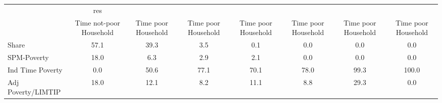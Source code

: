 \begin{tabular}{l*{7}{c}}
\hline\hline
            &         res&            &            &            &            &            &            \\
            &Time not-poor Household&Time poor Household&Time poor Household&Time poor Household&Time poor Household&Time poor Household&Time poor Household\\
\hline
Share       &        57.1&        39.3&         3.5&         0.1&         0.0&         0.0&         0.0\\
SPM-Poverty &        18.0&         6.3&         2.9&         2.1&         0.0&         0.0&         0.0\\
Ind Time Poverty&         0.0&        50.6&        77.1&        70.1&        78.0&        99.3&       100.0\\
Adj Poverty/LIMTIP&        18.0&        12.1&         8.2&        11.1&         8.8&        29.3&         0.0\\
\hline\hline
\end{tabular}

